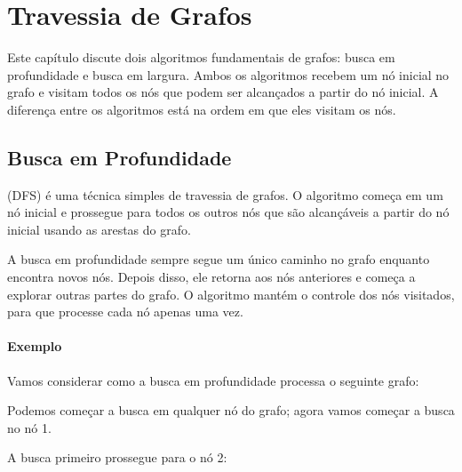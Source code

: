 \chapter{Travessia de Grafos}

Este capítulo discute dois algoritmos fundamentais de grafos: busca em profundidade e busca em largura. Ambos os algoritmos recebem um nó inicial no grafo e visitam todos os nós que podem ser alcançados a partir do nó inicial. A diferença entre os algoritmos está na ordem em que eles visitam os nós.

\section{Busca em Profundidade}


 (DFS) é uma técnica simples de travessia de grafos. O algoritmo começa em um nó inicial e prossegue para todos os outros nós que são alcançáveis a partir do nó inicial usando as arestas do grafo.

A busca em profundidade sempre segue um único caminho no grafo enquanto encontra novos nós. Depois disso, ele retorna aos nós anteriores e começa a explorar outras partes do grafo. O algoritmo mantém o controle dos nós visitados, para que processe cada nó apenas uma vez.

\subsubsection*{Exemplo}

Vamos considerar como a busca em profundidade processa o seguinte grafo:

\begin{center}
\end{center}

Podemos começar a busca em qualquer nó do grafo; agora vamos começar a busca no nó 1.

A busca primeiro prossegue para o nó 2:

